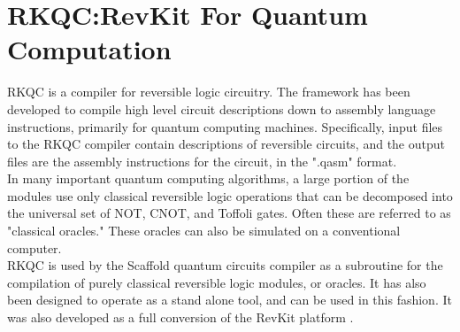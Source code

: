 \chapter{RKQC:RevKit For Quantum Computation}\label{ch:rkqc}

    RKQC is a compiler for reversible logic circuitry. The framework has been developed to compile high level circuit descriptions down to assembly language instructions, primarily for quantum computing machines. Specifically, input files to the RKQC compiler contain descriptions of reversible circuits, and the output files are the assembly instructions for the circuit, in the ".qasm" format.\\

    In many important quantum computing algorithms, a large portion of the modules use only classical reversible logic operations that can be decomposed into the universal set of NOT, CNOT, and Toffoli gates. Often these are referred to as "classical oracles." These oracles can also be simulated on a conventional computer.\\ 

    RKQC is used by the Scaffold quantum circuits compiler as a subroutine for the compilation of purely classical reversible logic modules, or oracles. It has also been designed to operate as a stand alone tool, and can be used in this fashion. It was also developed as a full conversion of the RevKit platform \cite{rev}.




